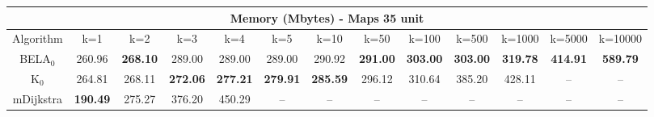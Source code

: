 \begin{tabular}{c|cccccccccccc}\toprule
\multicolumn{13}{c}{Memory (Mbytes) - Maps 35 unit}\\ \midrule
Algorithm & k=1 & k=2 & k=3 & k=4 & k=5 & k=10 & k=50 & k=100 & k=500 & k=1000 & k=5000 & k=10000 \\ \midrule
BELA$_0$ & 260.96 & \textbf{268.10} & 289.00 & 289.00 & 289.00 & 290.92 & \textbf{291.00} & \textbf{303.00} & \textbf{303.00} & \textbf{319.78} & \textbf{414.91} & \textbf{589.79} \\
K$_0$ & 264.81 & 268.11 & \textbf{272.06} & \textbf{277.21} & \textbf{279.91} & \textbf{285.59} & 296.12 & 310.64 & 385.20 & 428.11 & -- & -- \\
mDijkstra & \textbf{190.49} & 275.27 & 376.20 & 450.29 & -- & -- & -- & -- & -- & -- & -- & -- \\ \bottomrule 
\end{tabular}

